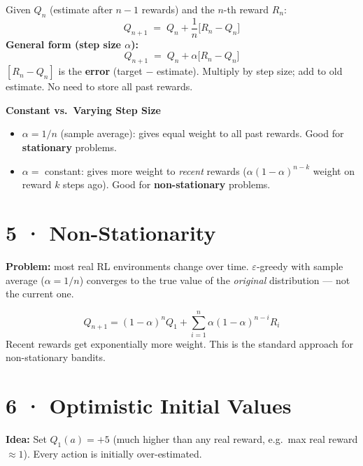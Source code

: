 \documentclass[11pt,a4paper]{article}
\begin{document}
\begin{tcolorbox}[defn={Incremental update rule}]
Given $Q_n$ (estimate after $n-1$ rewards) and the $n$-th reward $R_n$:
\[
  Q_{n+1} \;=\; Q_n + \frac{1}{n}\bigl[R_n - Q_n\bigr]
\]
\textbf{General form (step size $\alpha$):}
\[
  Q_{n+1} \;=\; Q_n + \alpha\bigl[R_n - Q_n\bigr]
\]
$[R_n - Q_n]$ is the \textbf{error} (target $-$ estimate). Multiply by step size; add to old estimate.
No need to store all past rewards.
\end{tcolorbox}

\textbf{Constant vs.\ Varying Step Size}
\begin{itemize}
  \item $\alpha = 1/n$ (sample average): gives equal weight to all past rewards. Good for \textbf{stationary} problems.
  \item $\alpha = $ constant: gives more weight to \emph{recent} rewards ($\alpha(1-\alpha)^{n-k}$ weight on reward $k$ steps ago).
    Good for \textbf{non-stationary} problems.
\end{itemize}

\section*{5 · Non-Stationarity}

\textbf{Problem:} most real RL environments change over time.
$\varepsilon$-greedy with sample average ($\alpha = 1/n$) converges to the true value of the
\emph{original} distribution — not the current one.

\begin{tcolorbox}[defn={Exponential recency-weighted average ($\alpha$ constant)}]
\[
  Q_{n+1} = (1-\alpha)^n Q_1 + \sum_{i=1}^{n} \alpha(1-\alpha)^{n-i} R_i
\]
Recent rewards get exponentially more weight. This is the standard approach for non-stationary bandits.
\end{tcolorbox}

\section*{6 · Optimistic Initial Values}

\textbf{Idea:} Set $Q_1(a) = +5$ (much higher than any real reward, e.g.\ max real reward $\approx 1$).
Every action is initially over-estimated.
\end{document}
